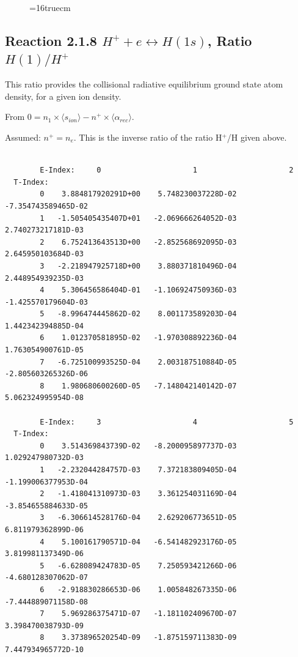 \documentclass[12pt,dvipdfmx]{article}
\begin{document}
\begin{figure} \label{2.1.5li2o}
\epsfxsize=16truecm
\end{figure}
\newpage

\subsection{
Reaction 2.1.8   $H^+ + e \leftrightarrow H(1s) $,  Ratio $H(1)/H^+$
}
This ratio provides the collisional radiative equilibrium ground state
atom density, for a given ion density.

From $0 = n_1 \times  \langle s_{ion} \rangle - n^+ \times \langle\alpha_{rec} \rangle$.

Assumed:  $n^+ = n_e$. This is the inverse ratio of the ratio H$^+$/H given
above.
\begin{small}\begin{verbatim}

        E-Index:     0                     1                     2
  T-Index:
        0    3.884817920291D+00    5.748230037228D-02   -7.354743589465D-02
        1   -1.505405435407D+01   -2.069666264052D-03    2.740273217181D-03
        2    6.752413643513D+00   -2.852568692095D-03    2.645950103684D-03
        3   -2.218947925718D+00    3.880371810496D-04    2.448954939235D-03
        4    5.306456586404D-01   -1.106924750936D-03   -1.425570179604D-03
        5   -8.996474445862D-02    8.001173589203D-04    1.442342394885D-04
        6    1.012370581895D-02   -1.970308892236D-04    1.763054900761D-05
        7   -6.725100993525D-04    2.003187510884D-05   -2.805603265326D-06
        8    1.980680600260D-05   -7.148042140142D-07    5.062324995954D-08

        E-Index:     3                     4                     5
  T-Index:
        0    3.514369843739D-02   -8.200095897737D-03    1.029247980732D-03
        1   -2.232044284757D-03    7.372183809405D-04   -1.199006377953D-04
        2   -1.418041310973D-03    3.361254031169D-04   -3.854655884633D-05
        3   -6.306614528176D-04    2.629206773651D-05    6.811979362899D-06
        4    5.100161790571D-04   -6.541482923176D-05    3.819981137349D-06
        5   -6.628089424783D-05    7.250593421266D-06   -4.680128307062D-07
        6   -2.918830286653D-06    1.005848267335D-06   -7.444889071158D-08
        7    5.969286375471D-07   -1.181102409670D-07    3.398470038793D-09
        8    3.373896520254D-09   -1.875159711383D-09    7.447934965772D-10


\end{verbatim}
\end{small}
\end{document}
